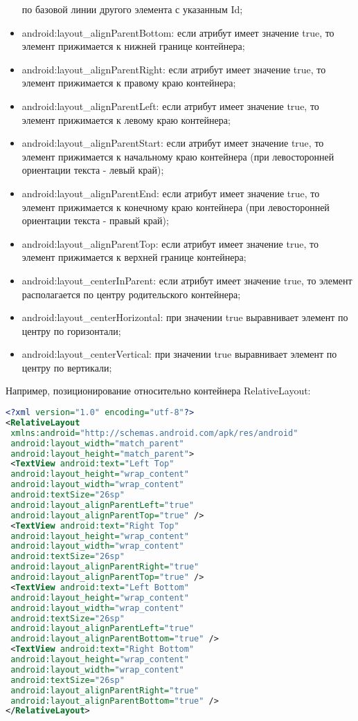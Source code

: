 \begin{itemize}
    по базовой линии другого элемента с указанным Id;
    \item android:layout\_alignParentBottom: если атрибут имеет значение
    true, то элемент прижимается к нижней границе контейнера;
    \item android:layout\_alignParentRight: если атрибут имеет значение true,
    то элемент прижимается к правому краю контейнера;
    \item android:layout\_alignParentLeft: если атрибут имеет значение true, то
    элемент прижимается к левому краю контейнера;
    \item android:layout\_alignParentStart: если атрибут имеет значение true,
    то элемент прижимается к начальному краю контейнера (при
    левосторонней ориентации текста - левый край);
    \item android:layout\_alignParentEnd: если атрибут имеет значение true, то
    элемент прижимается к конечному краю контейнера (при
    левосторонней ориентации текста - правый край);
    \item android:layout\_alignParentTop: если атрибут имеет значение true, то
    элемент прижимается к верхней границе контейнера;
    \item android:layout\_centerInParent: если атрибут имеет значение true, то
    элемент располагается по центру родительского контейнера;
    \item android:layout\_centerHorizontal: при значении true выравнивает
    элемент по центру по горизонтали;
    \item android:layout\_centerVertical: при значении true выравнивает
    элемент по центру по вертикали;
\end{itemize}
Например, позиционирование относительно контейнера RelativeLayout:
\begin{lstlisting}[language=xml, caption=\leftline{xml}, label=lst:RelativeLayout]
<?xml version="1.0" encoding="utf-8"?>
<RelativeLayout
 xmlns:android="http://schemas.android.com/apk/res/android"
 android:layout_width="match_parent"
 android:layout_height="match_parent">
 <TextView android:text="Left Top"
 android:layout_height="wrap_content"
 android:layout_width="wrap_content"
 android:textSize="26sp"
 android:layout_alignParentLeft="true"
 android:layout_alignParentTop="true" />
 <TextView android:text="Right Top"
 android:layout_height="wrap_content"
 android:layout_width="wrap_content"
 android:textSize="26sp"
 android:layout_alignParentRight="true"
 android:layout_alignParentTop="true" />
 <TextView android:text="Left Bottom"
 android:layout_height="wrap_content"
 android:layout_width="wrap_content"
 android:textSize="26sp"
 android:layout_alignParentLeft="true"
 android:layout_alignParentBottom="true" />
 <TextView android:text="Right Bottom"
 android:layout_height="wrap_content"
 android:layout_width="wrap_content"
 android:textSize="26sp"
 android:layout_alignParentRight="true"
 android:layout_alignParentBottom="true" />
</RelativeLayout>
\end{lstlisting}

